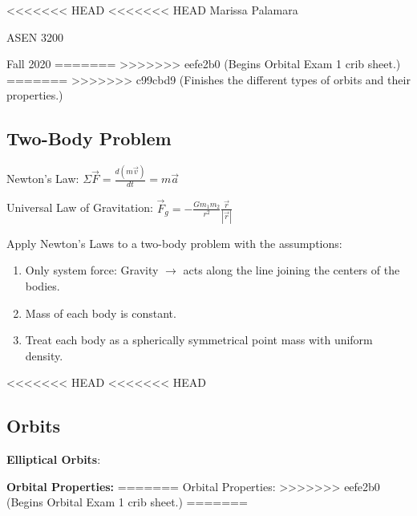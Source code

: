 \documentclass{article}
\begin{document}
\begin{multicols*}{3}
<<<<<<< HEAD
<<<<<<< HEAD
    Marissa Palamara\par 
    ASEN 3200\par 
    Fall 2020
    \vspace{-0.5cm}
=======
>>>>>>> eefe2b0 (Begins Orbital Exam 1 crib sheet.)
=======
>>>>>>> c99cbd9 (Finishes the different types of orbits and their properties.)
    \subsection*{Two-Body Problem}
    Newton's Law: $\Sigma \vec{F}=\frac{d(m\vec{v})}{dt}=m\vec{a}$ \par
    Universal Law of Gravitation: $\vec{F}_g=-\frac{Gm_1m_2}{r^2}\frac{\vec{r}}{|\vec{r}|}$\par 
    Apply Newton's Laws to a two-body problem with the assumptions:
    \begin{enumerate}
        \itemsep0em
        \item Only system force: Gravity $\rightarrow$ acts along the line joining the centers of the bodies.
        \item Mass of each body is constant.
        \item Treat each body as a spherically symmetrical point mass with uniform density.
    \end{enumerate}
<<<<<<< HEAD
<<<<<<< HEAD
    \subsection*{Orbits}
    \textbf{Elliptical Orbits}:\par
    \textbf{Orbital Properties:}
=======
    Orbital Properties:
>>>>>>> eefe2b0 (Begins Orbital Exam 1 crib sheet.)
=======

\end{multicols*}
\end{document}
